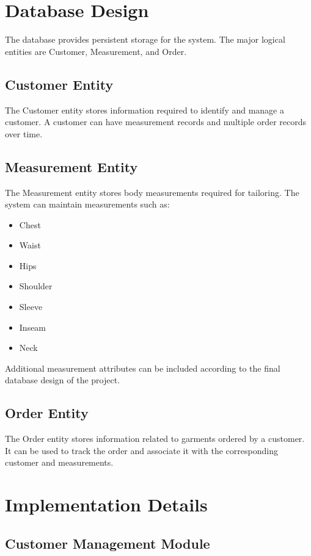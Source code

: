 \documentclass[12pt,a4paper]{report}
\begin{document}
\section{Database Design}

The database provides persistent storage for the system. The major logical
entities are Customer, Measurement, and Order.

\subsection{Customer Entity}

The Customer entity stores information required to identify and manage a
customer. A customer can have measurement records and multiple order records
over time.

\subsection{Measurement Entity}

The Measurement entity stores body measurements required for tailoring. The
system can maintain measurements such as:

\begin{itemize}
  \item Chest
  \item Waist
  \item Hips
  \item Shoulder
  \item Sleeve
  \item Inseam
  \item Neck
\end{itemize}

Additional measurement attributes can be included according to the final
database design of the project.

\subsection{Order Entity}

The Order entity stores information related to garments ordered by a
customer. It can be used to track the order and associate it with the
corresponding customer and measurements.

\section{Implementation Details}

\subsection{Customer Management Module}
\end{document}
